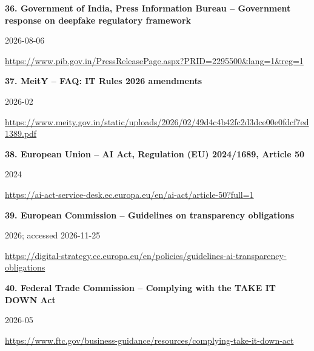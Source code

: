 \documentclass[11pt,a4paper]{article}
\begin{document}
\noindent\begin{minipage}{\linewidth}\textbf{36. Government of India, Press Information Bureau -- Government response on deepfake regulatory framework}\par{\small 2026-08-06\par\url{https://www.pib.gov.in/PressReleasePage.aspx?PRID=2295500&lang=1&reg=1}}\par
\end{minipage}\par\vspace{2mm}
\noindent\begin{minipage}{\linewidth}\textbf{37. MeitY -- FAQ: IT Rules 2026 amendments}\par{\small 2026-02\par\url{https://www.meity.gov.in/static/uploads/2026/02/49d4c4b42fc2d3dce00e0fdcf7ed1389.pdf}}\par
\end{minipage}\par\vspace{2mm}
\noindent\begin{minipage}{\linewidth}\textbf{38. European Union -- AI Act, Regulation (EU) 2024/1689, Article 50}\par{\small 2024\par\url{https://ai-act-service-desk.ec.europa.eu/en/ai-act/article-50?full=1}}\par
\end{minipage}\par\vspace{2mm}
\noindent\begin{minipage}{\linewidth}\textbf{39. European Commission -- Guidelines on transparency obligations}\par{\small 2026; accessed 2026-11-25\par\url{https://digital-strategy.ec.europa.eu/en/policies/guidelines-ai-transparency-obligations}}\par
\end{minipage}\par\vspace{2mm}
\noindent\begin{minipage}{\linewidth}\textbf{40. Federal Trade Commission -- Complying with the TAKE IT DOWN Act}\par{\small 2026-05\par\url{https://www.ftc.gov/business-guidance/resources/complying-take-it-down-act}}\par
\end{minipage}\par\vspace{2mm}
\end{document}
